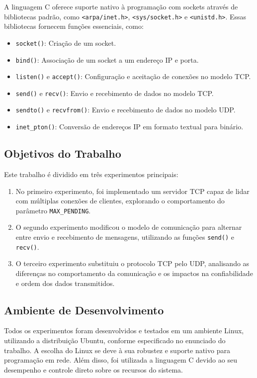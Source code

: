 A linguagem C oferece suporte nativo à programação com sockets através de bibliotecas padrão, como \texttt{<arpa/inet.h>}, \texttt{<sys/socket.h>} e \texttt{<unistd.h>}. Essas bibliotecas fornecem funções essenciais, como:
\begin{itemize}
    \item \texttt{socket()}: Criação de um socket.
    \item \texttt{bind()}: Associação de um socket a um endereço IP e porta.
    \item \texttt{listen()} e \texttt{accept()}: Configuração e aceitação de conexões no modelo TCP.
    \item \texttt{send()} e \texttt{recv()}: Envio e recebimento de dados no modelo TCP.
    \item \texttt{sendto()} e \texttt{recvfrom()}: Envio e recebimento de dados no modelo UDP.
    \item \texttt{inet\_pton()}: Conversão de endereços IP em formato textual para binário.
\end{itemize}

\subsection*{Objetivos do Trabalho}

Este trabalho é dividido em três experimentos principais:
\begin{enumerate}
    \item No primeiro experimento, foi implementado um servidor TCP capaz de lidar com múltiplas conexões de clientes, explorando o comportamento do parâmetro \texttt{MAX\_PENDING}.
    \item O segundo experimento modificou o modelo de comunicação para alternar entre envio e recebimento de mensagens, utilizando as funções \texttt{send()} e \texttt{recv()}.
    \item O terceiro experimento substituiu o protocolo TCP pelo UDP, analisando as diferenças no comportamento da comunicação e os impactos na confiabilidade e ordem dos dados transmitidos.
\end{enumerate}

\subsection*{Ambiente de Desenvolvimento}

Todos os experimentos foram desenvolvidos e testados em um ambiente Linux, utilizando a distribuição Ubuntu, conforme especificado no enunciado do trabalho. A escolha do Linux se deve à sua robustez e suporte nativo para programação em rede. Além disso, foi utilizada a linguagem C devido ao seu desempenho e controle direto sobre os recursos do sistema.

